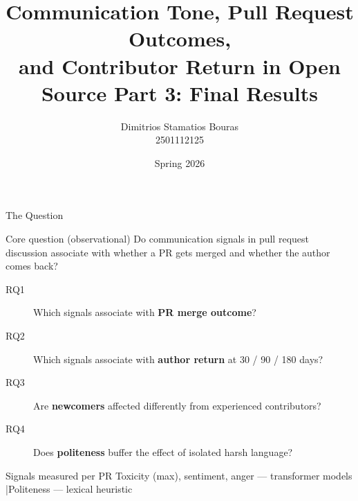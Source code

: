 \documentclass[aspectratio=169,11pt]{beamer}
\title[PR Communication Tone]{Communication Tone, Pull Request Outcomes,\\and Contributor Return in Open Source
\newline
Part 3: Final Results}
\author[D.S Bouras]{Dimitrios Stamatios Bouras \\ \small 2501112125}
\institute{Quantitative Analysis of Open Source Software}
\date{Spring 2026}
\begin{document}
\begin{frame}
\titlepage
\end{frame}

\begin{frame}{The Question}
\begin{block}{Core question (observational)}
Do communication signals in pull request discussion associate with whether a PR gets merged and whether the author comes back?
\end{block}

\vspace{0.5em}
\begin{description}
  \item[RQ1] Which signals associate with \textbf{PR merge outcome}?
  \item[RQ2] Which signals associate with \textbf{author return} at 30 / 90 / 180 days?
  \item[RQ3] Are \textbf{newcomers} affected differently from experienced contributors?
  \item[RQ4] Does \textbf{politeness} buffer the effect of isolated harsh language?
\end{description}

\vspace{0.5em}
\begin{exampleblock}{Signals measured per PR}
Toxicity (max), sentiment, anger --- transformer models \quad|\quad Politeness --- lexical heuristic
\end{exampleblock}
\end{frame}
\end{document}
